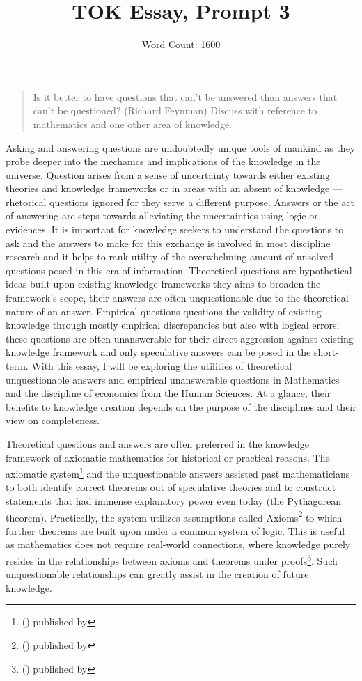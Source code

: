 \documentclass[a4paper,12pt]{article}
\title{\vspace{-8ex}TOK Essay, Prompt 3}
\author{Word Count: 1600}
\date{}
\newcommand{\citefoot}[1]{\footnote{\citeall{#1}}}
\newcommand{\citeall}[1]{\citeauth{#1} \citetitle{#1} (\citeyear{#1}) published by \citelist{#1}{publisher}}
\begin{document}
\maketitle
\begin{quote}
    Is it better to have questions that can't be answered than answers that can't be questioned? (Richard Feynman) Discuss with reference to mathematics and one other area of knowledge.
\end{quote}


Asking and answering questions are undoubtedly unique tools of mankind as they probe deeper into the mechanics and implications of the knowledge in the universe. Question arises from a sense of uncertainty towards either existing theories and knowledge frameworks or in areas with an absent of knowledge --- rhetorical questions ignored for they serve a different purpose. Answers or the act of answering are steps towards alleviating the uncertainties using logic or evidences. It is important for knowledge seekers to understand the questions to ask and the answers to make for this exchange is involved in most discipline research and it helps to rank utility of the overwhelming amount of unsolved questions posed in this era of information. Theoretical questions are hypothetical ideas built upon existing knowledge frameworks they aims to broaden the framework's scope, their answers are often unquestionable due to the theoretical nature of an answer. Empirical questions questions the validity of existing knowledge through mostly empirical discrepancies but also with logical errors; these questions are often unanswerable for their direct aggression against existing knowledge framework and only speculative answers can be posed in the short-term. With this essay, I will be exploring the utilities of theoretical unquestionable answers and empirical unanswerable questions in Mathematics and the discipline of economics from the Human Sciences. At a glance, their benefits to knowledge creation depends on the purpose of the disciplines and their view on completeness.


Theoretical questions and answers are often preferred in the knowledge framework of axiomatic mathematics for historical or practical reasons. The axiomatic system\citefoot{axiomatic} and the unquestionable answers assisted past mathematicians to both identify correct theorems out of speculative theories and to construct statements that had immense explanatory power even today (the Pythagorean theorem). Practically, the system utilizes assumptions called Axioms\citefoot{axiom} to which further theorems are built upon under a common system of logic. This is useful as mathematics does not require real-world connections, where knowledge purely resides in the relationships between axioms and theorems under proofs\citefoot{horsten_2022}. Such unquestionable relationships can greatly assist in the creation of future knowledge.
\end{document}
